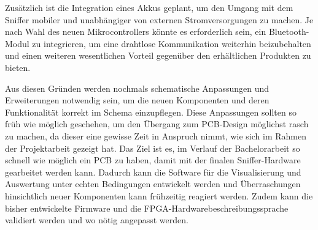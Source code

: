 Zusätzlich ist die Integration eines Akkus geplant, um den Umgang mit dem Sniffer mobiler und unabhängiger von externen Stromversorgungen zu machen. Je nach Wahl des neuen Mikrocontrollers könnte es erforderlich sein, ein Bluetooth-Modul zu integrieren, um eine drahtlose Kommunikation weiterhin beizubehalten und einen weiteren wesentlichen Vorteil gegenüber den erhältlichen Produkten zu bieten.

Aus diesen Gründen werden nochmals schematische Anpassungen und Erweiterungen notwendig sein, um die neuen Komponenten und deren Funktionalität korrekt im Schema einzupflegen. Diese Anpassungen sollten so früh wie möglich geschehen, um den Übergang zum PCB-Design möglichst rasch zu machen, da dieser eine gewisse Zeit in Anspruch nimmt, wie sich im Rahmen der Projektarbeit gezeigt hat. Das Ziel ist es, im Verlauf der Bachelorarbeit so schnell wie möglich ein PCB zu haben, damit mit der finalen Sniffer-Hardware gearbeitet werden kann. Dadurch kann die Software für die Visualisierung und Auswertung unter echten Bedingungen entwickelt werden und Überraschungen hinsichtlich neuer Komponenten kann frühzeitig reagiert werden. Zudem kann die bisher entwickelte Firmware und die FPGA-Hardwarebeschreibungssprache validiert werden und wo nötig angepasst werden.
